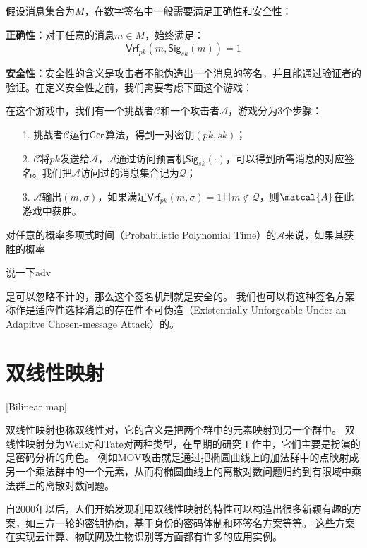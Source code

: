 假设消息集合为$M$，在数字签名中一般需要满足正确性和安全性：

\textbf{正确性：}对于任意的消息$m\in M$，始终满足：
$$\mathsf{Vrf}_{pk}(m,\mathsf{Sig}_{sk}(m))=1$$

\textbf{安全性：}安全性的含义是攻击者不能伪造出一个消息的签名，并且能通过验证者的验证。在定义安全性之前，我们需要考虑下面这个游戏：

在这个游戏中，我们有一个挑战者$\mathcal{C}$和一个攻击者$\mathcal{A}$，游戏分为3个步骤：
\begin{itemize}
  \item[1.] 挑战者$\mathcal{C}$运行$\mathsf{Gen}$算法，得到一对密钥$(pk,sk)$；
  \item[2.] $\mathcal{C}$将$pk$发送给$\mathcal{A}$，$\mathcal{A}$通过访问预言机$\mathsf{Sig}_{sk}(\cdot)$，可以得到所需消息的对应签名。我们把$\mathcal{A}$访问过的消息集合记为$\mathcal{Q}$；
  \item[3.] $\mathcal{A}$输出$(m,\sigma)$，如果满足$\mathsf{Vrf}_{pk}(m,\sigma)=1$且$m\notin \mathcal{Q}$，则$\matcal{A}$在此游戏中获胜。
\end{itemize}

对任意的概率多项式时间（Probabilistic Polynomial Time）的$\mathcal{A}$来说，如果其获胜的概率

说一下adv

是可以忽略不计的，那么这个签名机制就是安全的。
我们也可以将这种签名方案称作是适应性选择消息的存在性不可伪造（Existentially Unforgeable Under an Adapitve Chosen-message Attack）的。

\section{双线性映射}[Bilinear map]

双线性映射也称双线性对，它的含义是把两个群中的元素映射到另一个群中\cite{张方国2016从双线性对到多线性映射}。
双线性映射分为Weil对和Tate对两种类型，在早期的研究工作中，它们主要是扮演的是密码分析的角色。
例如MOV攻击就是通过把椭圆曲线上的加法群中的点映射成另一个乘法群中的一个元素，从而将椭圆曲线上的离散对数问题归约到有限域中乘法群上的离散对数问题。

自2000年以后，人们开始发现利用双线性映射的特性可以构造出很多新颖有趣的方案，如三方一轮的密钥协商\cite{joux2000one}，基于身份的密码体制\cite{boneh2001identity}和环签名\cite{chow2005efficient}方案等等。
这些方案在实现云计算、物联网及生物识别等方面都有许多的应用实例。

